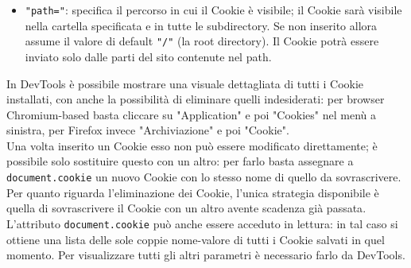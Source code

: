 \documentclass[a4paper, 12pt, twoside, openright]{book}
\begin{document}
\begin{itemize}
\item\texttt{"path="}: specifica il percorso in cui il Cookie è visibile; il Cookie sarà visibile nella cartella specificata e in tutte le subdirectory. Se non inserito allora assume il valore di default \texttt{"/"} (la root directory). Il Cookie potrà essere inviato solo dalle parti del sito contenute nel path\cite{MDN_Web_docs:HTTP_cookies}.
\end{itemize}
In DevTools è possibile mostrare una visuale dettagliata di tutti i Cookie installati, con anche la possibilità di eliminare quelli indesiderati: per browser Chromium-based basta cliccare su "Application" e poi "Cookies" nel menù a sinistra, per Firefox invece "Archiviazione" e poi "Cookie".\\
Una volta inserito un Cookie esso non può essere modificato direttamente; è possibile solo sostituire questo con un altro: per farlo basta assegnare a \texttt{document.cookie} un nuovo Cookie con lo stesso nome di quello da sovrascrivere\cite{W3Schools:cookies}.\\
Per quanto riguarda l'eliminazione dei Cookie, l'unica strategia disponibile è quella di sovrascrivere il Cookie con un altro avente scadenza già passata\cite{W3Schools:cookies}.\\
L'attributo \texttt{document.cookie} può anche essere acceduto in lettura: in tal caso si ottiene una lista delle sole coppie nome-valore di tutti i Cookie salvati in quel momento\cite{MDN_Web_docs:cookies}. Per visualizzare tutti gli altri parametri è necessario farlo da DevTools.
\backmatter

\begingroup %
  \makeatletter
  \let\ps@plain\ps@empty
  \makeatother
  
\endgroup
\end{document}
